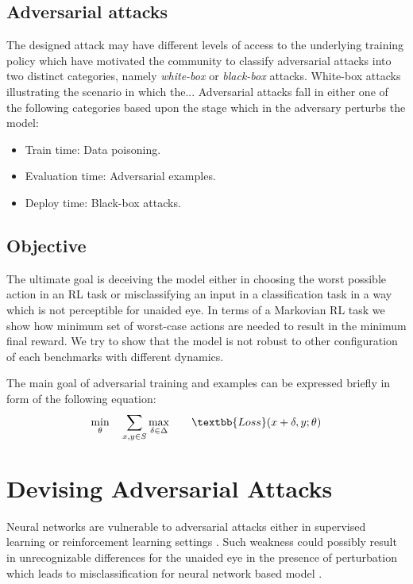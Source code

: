 \documentclass[letterpaper,12pt]{article}
\begin{document}
\subsection{Adversarial attacks}
The designed attack may have different levels of access to the underlying training policy which have motivated the community to classify adversarial attacks into two distinct categories, namely \textit{white-box} or \textit{black-box} attacks. White-box attacks illustrating the scenario in which the... Adversarial attacks fall in either one of the following categories based upon the stage which in the adversary perturbs the model:
\begin{itemize}
    \item Train time: Data poisoning.
    \item Evaluation time: Adversarial examples.
    \item Deploy time: Black-box attacks.
\end{itemize}


\subsection{Objective}
The ultimate goal is deceiving the model either in choosing the worst possible action in an RL task or misclassifying an input in a classification task in a way which is not perceptible for unaided eye. In terms of a Markovian RL task we show how minimum set of worst-case actions are needed to result in the minimum final reward. We try to show that the model is not robust to other configuration of each benchmarks with different dynamics.

The main goal of adversarial training and examples can be expressed briefly in form of the following equation:
\begin{equation}
\begin{aligned}
& \underset{\theta}{\min}
& & \sum_{x,y \in S} \underset{\delta \in \Delta}{\max}
& & & \textbb{Loss}(x + \delta, y; \theta)
\end{aligned}
\end{equation}

\section{Devising Adversarial Attacks}
Neural networks are vulnerable to adversarial attacks either in supervised learning or reinforcement learning settings \cite{Huang2017}. Such weakness could possibly result in unrecognizable differences for the unaided eye in the presence of perturbation which leads to misclassification for neural network based model \cite{Szegedy2014, Goodfellow2014}. 
\end{document}
